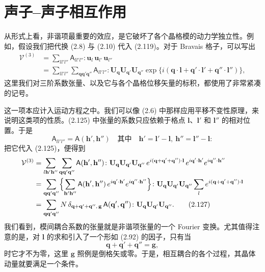 \section{声子–声子相互作用}

从形式上看，非谐项最重要的效应，是它破坏了各个晶格模的动力学独立性。例如，假设我们把代换 (2.8) 与 (2.10) 代入 (2.119)。对于 Bravais 格子，可以写出
\begin{align*}
\mathcal{V}^{(3)} &= \sum_{ll'l''}\mathsf{A}_{ll'l''}\colon \mathbf{u}_l\,\mathbf{u}_{l'}\,\mathbf{u}_{l''}\\
&= \sum_{ll'l''}\sum_{\mathbf{q}\mathbf{q}'\mathbf{q}''}\mathsf{A}_{ll'l''}\colon \mathbf{U}_{\mathbf{q}}\mathbf{U}_{\mathbf{q}'}\mathbf{U}_{\mathbf{q}''}\exp\bigl\{i(\mathbf{q}\cdot\mathbf{l}+\mathbf{q}'\cdot\mathbf{l}'+\mathbf{q}''\cdot\mathbf{l}'')\bigr\},
\tag{2.125}
\end{align*}
这里我们对三阶系数张量、以及它与各个晶格位移矢量的标积，都使用了非常紧凑的记号。

这一项本应计入运动方程之中。我们可以像 (2.6) 中那样应用平移不变性原理，来说明这类项的性质。(2.125) 中张量的系数只应依赖于格点 $\mathbf{l}$、$\mathbf{l}'$ 和 $\mathbf{l}''$ 的相对位置。于是
\begin{equation*}
\mathsf{A}_{ll'l''}=\mathsf{A}(\mathbf{h}',\mathbf{h}'')\quad\text{其中}\quad \mathbf{h}'=\mathbf{l}'-\mathbf{l},\ \mathbf{h}''=\mathbf{l}''-\mathbf{l}:
\tag{2.126}
\end{equation*}
把它代入 (2.125)，便得到
\begin{align*}
\mathcal{V}^{(3)} &= \sum_{l\mathbf{h}'\mathbf{h}''}\sum_{\mathbf{q}\mathbf{q}'\mathbf{q}''}\mathsf{A}(\mathbf{h}',\mathbf{h}'')\colon \mathbf{U}_{\mathbf{q}}\mathbf{U}_{\mathbf{q}'}\mathbf{U}_{\mathbf{q}''}\,e^{i(\mathbf{q}+\mathbf{q}'+\mathbf{q}'')\cdot\mathbf{l}}\,e^{i\mathbf{q}'\cdot\mathbf{h}'}e^{i\mathbf{q}''\cdot\mathbf{h}''}\\
&= \sum_{\mathbf{q}\mathbf{q}'\mathbf{q}''}\Bigl\{\sum_{\mathbf{h}'\mathbf{h}''}\mathsf{A}(\mathbf{h}',\mathbf{h}'')\,e^{i\mathbf{q}'\cdot\mathbf{h}'}e^{i\mathbf{q}''\cdot\mathbf{h}''}\Bigr\}\colon \mathbf{U}_{\mathbf{q}}\mathbf{U}_{\mathbf{q}'}\mathbf{U}_{\mathbf{q}''}\sum_{l}e^{i(\mathbf{q}+\mathbf{q}'+\mathbf{q}'')\cdot\mathbf{l}}\\
&= \sum_{\mathbf{q}\mathbf{q}'\mathbf{q}''}N\,\delta_{\mathbf{q}+\mathbf{q}'+\mathbf{q}'',\,\mathbf{g}}\,\mathsf{A}(\mathbf{q}',\mathbf{q}'')\colon \mathbf{U}_{\mathbf{q}}\mathbf{U}_{\mathbf{q}'}\mathbf{U}_{\mathbf{q}''}.
\tag{2.127}
\end{align*}
我们看到，模间耦合系数的张量就是非谐项张量的一个 Fourier 变换。尤其值得注意的是，对 $\mathbf{l}$ 的求和引入了一个形如 (2.92) 的因子，只有当
\begin{equation*}
\mathbf{q}+\mathbf{q}'+\mathbf{q}''=\mathbf{g},
\tag{2.128}
\end{equation*}
时它才不为零，这里 $\mathbf{g}$ 照例是倒格矢或零。于是，相互耦合的各个过程，其晶体动量就要满足一个条件。

